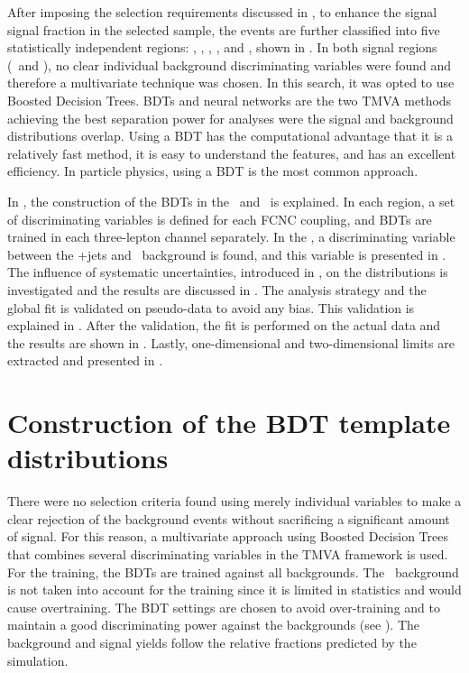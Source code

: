 After imposing the selection requirements discussed in , to enhance the signal signal fraction in the selected sample, the events are further classified into five statistically independent regions: \STSR, \TTSR, \WZCR, \STCR, and \TTCR, shown in . In both signal regions (\STSR\ and \TTSR), no clear individual background discriminating variables were found and therefore a multivariate technique was chosen. In this search, it was opted to use Boosted Decision Trees. BDTs and neural networks are the two TMVA methods achieving the best separation power for analyses were the signal and background distributions overlap. Using a BDT has the computational advantage that it is a relatively fast method, it is easy to understand the features,  and has an excellent efficiency. In particle physics, using a  BDT is the most common approach. 

In , the construction of the BDTs in the \STSR\ and \TTSR\ is explained. In each region, a set of discriminating variables is defined for each FCNC coupling, and BDTs are trained in each three-lepton channel separately. In the \WZCR, a discriminating variable between the \WZ+jets and \NPL\ background is found, and this variable is presented in . The influence of systematic uncertainties, introduced in , on the distributions is investigated and the results are discussed in . The analysis strategy and the global fit is validated on pseudo-data to avoid any bias. This validation is explained in . After the validation, the fit is performed on the actual data and the results are shown in . Lastly, one-dimensional and two-dimensional limits are extracted and presented in .


\section{Construction of the BDT template distributions}
\label{sec:templates}
There were no selection criteria found using merely individual variables to make a clear rejection of the background events without sacrificing a significant amount of signal. For this reason, a multivariate approach using Boosted Decision Trees that combines several discriminating variables in the TMVA framework is used. For the training, the BDTs are trained against all backgrounds.  The \NPL\ background is not taken into account for the training since it is limited in statistics and would cause overtraining. The BDT settings are chosen to avoid over-training and to maintain a good discriminating power against the backgrounds (see ). The background and signal yields follow the relative fractions predicted by the simulation. 

